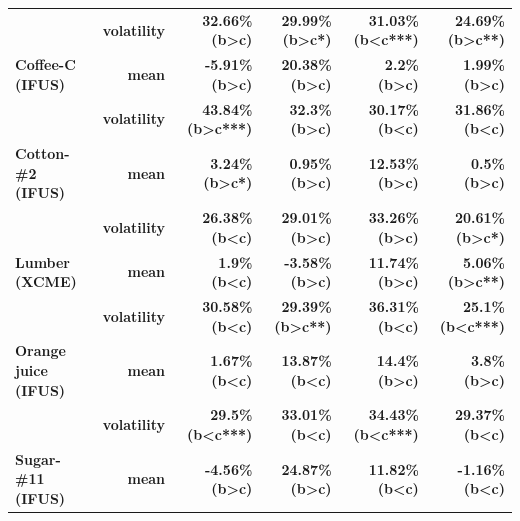 \documentclass[
  authoryear,
  preprint,
  3p]{elsarticle}
\begin{document}
\begin{longtable}[t]{>{}l>{}r>{}r>{}r>{}r>{}r}
\textbf{} & \textbf{volatility} & \textcolor[HTML]{4285f4}{\textbf{32.66\% (b>c)}} & \textcolor[HTML]{4285f4}{\textbf{29.99\% (b>c*)}} & \textcolor[HTML]{4285f4}{\textbf{31.03\% (b<c***)}} & \textcolor[HTML]{4285f4}{\textbf{24.69\% (b>c**)}}\\
\addlinespace
\textbf{Coffee-C (IFUS)} & \textbf{mean} & \textcolor[HTML]{4285f4}{\textbf{-5.91\% (b>c)}} & \textcolor[HTML]{4285f4}{\textbf{20.38\% (b>c)}} & \textcolor[HTML]{4285f4}{\textbf{2.2\% (b>c)}} & \textcolor[HTML]{4285f4}{\textbf{1.99\% (b>c)}}\\
\textbf{} & \textbf{volatility} & \textcolor[HTML]{4285f4}{\textbf{43.84\% (b>c***)}} & \textcolor[HTML]{4285f4}{\textbf{32.3\% (b>c)}} & \textcolor[HTML]{4285f4}{\textbf{30.17\% (b<c)}} & \textcolor[HTML]{4285f4}{\textbf{31.86\% (b<c)}}\\
\textbf{Cotton-\#2 (IFUS)} & \textbf{mean} & \textcolor[HTML]{4285f4}{\textbf{3.24\% (b>c*)}} & \textcolor[HTML]{4285f4}{\textbf{0.95\% (b>c)}} & \textcolor[HTML]{4285f4}{\textbf{12.53\% (b>c)}} & \textcolor[HTML]{4285f4}{\textbf{0.5\% (b>c)}}\\
\textbf{} & \textbf{volatility} & \textcolor[HTML]{4285f4}{\textbf{26.38\% (b<c)}} & \textcolor[HTML]{4285f4}{\textbf{29.01\% (b>c)}} & \textcolor[HTML]{4285f4}{\textbf{33.26\% (b>c)}} & \textcolor[HTML]{4285f4}{\textbf{20.61\% (b>c*)}}\\
\textbf{Lumber (XCME)} & \textbf{mean} & \textcolor[HTML]{4285f4}{\textbf{1.9\% (b<c)}} & \textcolor[HTML]{4285f4}{\textbf{-3.58\% (b>c)}} & \textcolor[HTML]{4285f4}{\textbf{11.74\% (b>c)}} & \textcolor[HTML]{4285f4}{\textbf{5.06\% (b>c**)}}\\
\addlinespace
\textbf{} & \textbf{volatility} & \textcolor[HTML]{4285f4}{\textbf{30.58\% (b<c)}} & \textcolor[HTML]{4285f4}{\textbf{29.39\% (b>c**)}} & \textcolor[HTML]{4285f4}{\textbf{36.31\% (b<c)}} & \textcolor[HTML]{4285f4}{\textbf{25.1\% (b<c***)}}\\
\textbf{Orange juice (IFUS)} & \textbf{mean} & \textcolor[HTML]{4285f4}{\textbf{1.67\% (b<c)}} & \textcolor[HTML]{4285f4}{\textbf{13.87\% (b<c)}} & \textcolor[HTML]{4285f4}{\textbf{14.4\% (b>c)}} & \textcolor[HTML]{4285f4}{\textbf{3.8\% (b>c)}}\\
\textbf{} & \textbf{volatility} & \textcolor[HTML]{4285f4}{\textbf{29.5\% (b<c***)}} & \textcolor[HTML]{4285f4}{\textbf{33.01\% (b<c)}} & \textcolor[HTML]{4285f4}{\textbf{34.43\% (b<c***)}} & \textcolor[HTML]{4285f4}{\textbf{29.37\% (b<c)}}\\
\textbf{Sugar-\#11 (IFUS)} & \textbf{mean} & \textcolor[HTML]{4285f4}{\textbf{-4.56\% (b>c)}} & \textcolor[HTML]{4285f4}{\textbf{24.87\% (b>c)}} & \textcolor[HTML]{4285f4}{\textbf{11.82\% (b<c)}} & \textcolor[HTML]{4285f4}{\textbf{-1.16\% (b<c)}}\\

\end{longtable}
\end{document}
